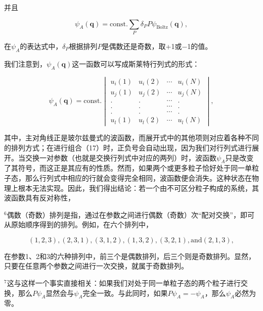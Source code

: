 并且

\begin{equation}\tag{5.4.16}\label{eq:5.4.16}
\psi _ { A } ( \pmb { q } ) = \mathrm { c o n s t . } \sum _ { P } \delta _ { P } P \psi _ { \mathrm { B o l t z } } ( \pmb { q } ) ,
\end{equation}

在\(\psi_{A}\)的表达式中，\(\delta_{P}\)根据排列\(P\)是偶数还是奇数，取+1或−1的值。

我们注意到，\(\psi_{A}(\boldsymbol{q})\)这一函数可以写成斯莱特行列式的形式：

\begin{equation}\tag{5.4.17}\label{eq:5.4.17}
\psi_A(\boldsymbol{q})=\mathrm{const.}\begin{vmatrix}u_i(1)&u_i(2)&\cdots&u_i(N)\\u_j(1)&u_j(2)&\cdots&u_j(N)\\.&.&\cdots&.\\.&.&\cdots&.\\.&.&\cdots&.\\u_l(1)&u_l(2)&\cdots&u_l(N)\end{vmatrix},
\end{equation}

其中，主对角线正是玻尔兹曼式的波函数，而展开式中的其他项则对应着各种不同的排列方式；在进行组合（17）时，正负号会自动出现，因为我们对行列式进行展开。当交换一对参数（也就是交换行列式中对应的两列）时，波函数\(\psi_{A}\)只是改变了其符号，而这正是其应有的性质。然而，如果两个或更多粒子恰好处于同一单粒子态，那么行列式中相应的行就会变得完全相同，波函数便会消失。这种状态在物理上根本无法实现。因此，我们得出结论：若一个由不可区分粒子构成的系统，其波函数具有反对称性，

\(^{6}\)偶数（奇数）排列是指，通过在参数之间进行偶数（奇数）次``配对交换''，即可从原始顺序得到的排列。例如，在六个排列中，

\begin{equation}\tag{5.4.18}\label{eq:5.4.18}
( 1 , 2 , 3 ) ,  ( 2 , 3 , 1 ) ,  ( 3 , 1 , 2 ) ,  ( 1 , 3 , 2 ) ,  ( 3 , 2 , 1 ) ,  \mathrm { a n d }  ( 2 , 1 , 3 ) ,
\end{equation}

在参数1、2和3的六种排列中，前三个是偶数排列，后三个则是奇数排列。显然，只要在任意两个参数之间进行一次交换，就属于奇数排列。

\(^{7}\)这与这样一个事实直接相关：如果我们对处于同一单粒子态的两个粒子进行交换，那么\(P\psi_{A}\)显然会与\(\psi_{A}\)完全一致。与此同时，如果\(P\psi_{A} = -\psi_{A}\)，那么\(\psi_{A}\)必然为零。


